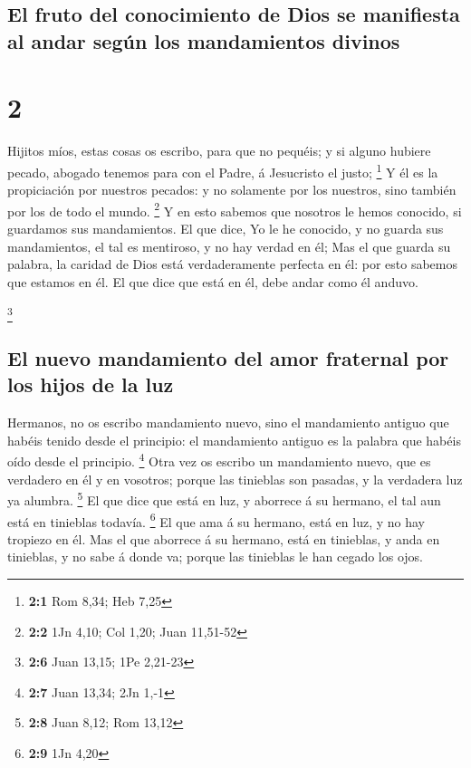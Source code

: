 \hypertarget{el-fruto-del-conocimiento-de-dios-se-manifiesta-al-andar-seguxfan-los-mandamientos-divinos}{%
\subsection{El fruto del conocimiento de Dios se manifiesta al andar
según los mandamientos
divinos}\label{el-fruto-del-conocimiento-de-dios-se-manifiesta-al-andar-seguxfan-los-mandamientos-divinos}}

\hypertarget{section-1}{%
\section{2}\label{section-1}}

 Hijitos míos, estas cosas os escribo, para que no
pequéis; y si alguno hubiere pecado, abogado tenemos para con el Padre,
á Jesucristo el justo; \footnote{\textbf{2:1} Rom 8,34; Heb 7,25}
 Y él es la propiciación por nuestros pecados: y no
solamente por los nuestros, sino también por los de todo el mundo.
\footnote{\textbf{2:2} 1Jn 4,10; Col 1,20; Juan 11,51-52} 
Y en esto sabemos que nosotros le hemos conocido, si guardamos sus
mandamientos.  El que dice, Yo le he conocido, y no guarda
sus mandamientos, el tal es mentiroso, y no hay verdad en él;
 Mas el que guarda su palabra, la caridad de Dios está
verdaderamente perfecta en él: por esto sabemos que estamos en él.
 El que dice que está en él, debe andar como él anduvo.

\footnote{\textbf{2:6} Juan 13,15; 1Pe 2,21-23}

\hypertarget{el-nuevo-mandamiento-del-amor-fraternal-por-los-hijos-de-la-luz}{%
\subsection{El nuevo mandamiento del amor fraternal por los hijos de la
luz}\label{el-nuevo-mandamiento-del-amor-fraternal-por-los-hijos-de-la-luz}}

 Hermanos, no os escribo mandamiento nuevo, sino el
mandamiento antiguo que habéis tenido desde el principio: el mandamiento
antiguo es la palabra que habéis oído desde el principio. \footnote{\textbf{2:7}
  Juan 13,34; 2Jn 1,-1}  Otra vez os escribo un
mandamiento nuevo, que es verdadero en él y en vosotros; porque las
tinieblas son pasadas, y la verdadera luz ya alumbra. \footnote{\textbf{2:8}
  Juan 8,12; Rom 13,12}  El que dice que está en luz, y
aborrece á su hermano, el tal aun está en tinieblas todavía. \footnote{\textbf{2:9}
  1Jn 4,20}  El que ama á su hermano, está en luz, y no
hay tropiezo en él.  Mas el que aborrece á su hermano,
está en tinieblas, y anda en tinieblas, y no sabe á donde va; porque las
tinieblas le han cegado los ojos.

